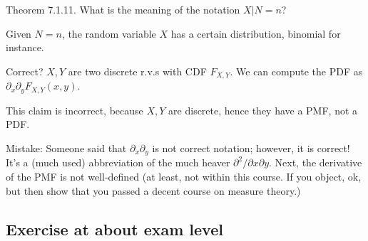 \documentclass[../../assignments/assignments]{subfiles}
\begin{document}
\begin{exercise}
Theorem 7.1.11. What is the meaning of the notation $X|N=n$?
\begin{solution}
  Given $N=n$, the random variable $X$ has a certain distribution, binomial for instance.
\end{solution}
\end{exercise}

\begin{exercise}
Correct? $X, Y$ are two discrete r.v.s with CDF $F_{X,Y}$. We can compute the PDF as $\partial_{x}\partial_{y} F_{X,Y}(x,y)$.
\begin{solution}
This claim is incorrect, because $X, Y$ are discrete, hence they have a PMF, not a PDF.

Mistake: Someone said that $\partial_{x}\partial_{y}$ is not correct notation; however, it is correct! It's a (much used) abbreviation of the much heaver $\partial^{2}/\partial x \partial y$. Next, the derivative of the PMF is not well-defined (at least, not within this course. If you object, ok, but then show that you passed a decent course on measure theory.)
\end{solution}
\end{exercise}


\subsection{Exercise at about exam level}
\end{document}
